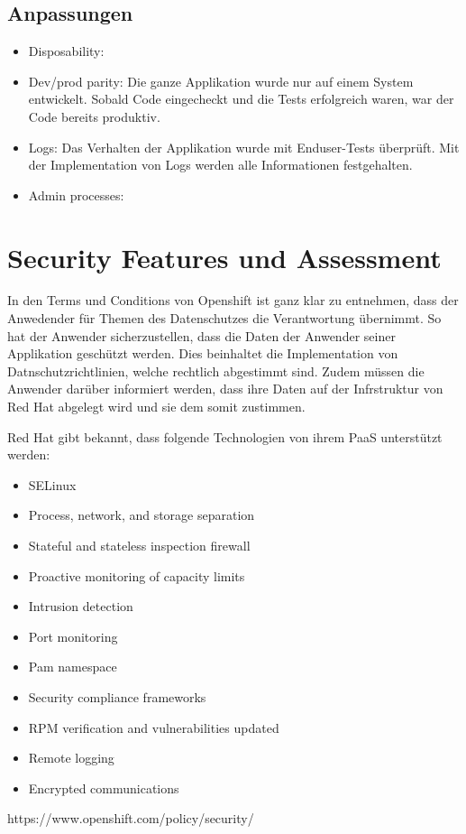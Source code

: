 \documentclass[12pt,a4paper]{article}
\begin{document}
\subsection{Anpassungen}
    \begin{itemize}
        \item Disposability:
        \item Dev/prod parity: Die ganze Applikation wurde nur auf einem System entwickelt. Sobald Code eingecheckt und die Tests
              erfolgreich waren, war der Code bereits produktiv.
        \item Logs: Das Verhalten der Applikation wurde mit Enduser-Tests überprüft. Mit der Implementation von Logs werden alle
              Informationen festgehalten.
        \item Admin processes:
    \end{itemize}

\section{Security Features und Assessment}

In den Terms und Conditions von Openshift ist ganz klar zu entnehmen, dass der Anwedender für Themen des Datenschutzes die Verantwortung übernimmt.
So hat der Anwender sicherzustellen, dass die Daten der Anwender seiner Applikation geschützt werden. Dies beinhaltet die Implementation von
Datnschutzrichtlinien, welche rechtlich abgestimmt sind. Zudem müssen die Anwender darüber informiert werden, dass ihre Daten auf der Infrstruktur
von Red Hat abgelegt wird und sie dem somit zustimmen.

Red Hat gibt bekannt, dass folgende Technologien von ihrem PaaS unterstützt werden:

\begin{itemize}
    \item SELinux
    \item Process, network, and storage separation
    \item Stateful and stateless inspection firewall
    \item Proactive monitoring of capacity limits
    \item Intrusion detection
    \item Port monitoring
    \item Pam namespace
    \item Security compliance frameworks
    \item RPM verification and vulnerabilities updated
    \item Remote logging
    \item Encrypted communications
\end{itemize}
https://www.openshift.com/policy/security/
\end{document}
